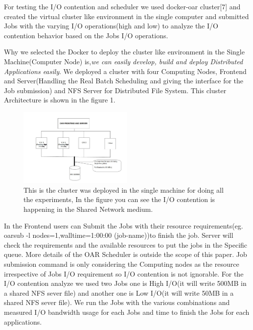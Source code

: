 \documentclass{article}
\begin{document}
For testing the I/O contention and scheduler we used docker-oar cluster[7] and  created the virtual cluster like environment in the single computer and submitted Jobs with the  varying I/O operations(high and low) to analyze the I/O contention behavior based on the Jobs I/O operations. %


Why we selected the Docker to deploy the cluster like environment in the Single Machine(Computer Node) is,{\em we can easily develop, build and deploy Distributed Applications easily}\cite{docker-oar}\cite{docker}. We deployed a cluster with four Computing Nodes, Frontend and Server(Handling the Real Batch Scheduling and giving the interface for the Job submission)\cite{inproceedingscapit.cd-cghmmnr_bswhlc_05} and NFS Server for Distributed File System. This cluster Architecture is shown in the figure 1.
\newline
\begin{figure}
  \centering    
      \includegraphics[width=0.5\textwidth]{CusterArchitecture-exp.jpg}
  \caption{This is the cluster was deployed in the single machine for doing all the experiments, In the figure you can see the I/O contention is happening in the Shared Network medium. }
\end{figure}
In the Frontend users can Submit the Jobs with their resource requirements(eg. oarsub -l nodes=1,walltime=1:00:00 (job-name))to finish the job. Server will check the requirements and the available resources to put the jobs in the Specific queue. More details of the OAR\cite{inproceedingscapit.cd-cghmmnr_bswhlc_05} Scheduler is outside the scope of this paper. Job submission command is only considering the {\typebf Computing nodes} as the resource irrespective of Jobs I/O requirement so I/O contention is not ignorable. For the I/O contention analyze we used two Jobs one is High I/O(it will write 500MB in a shared NFS sever file) and another one is Low I/O(it will write 50MB in a shared NFS sever file). We run the Jobs with the various combinations and measured I/O bandwidth usage for each Jobs and time to finish the Jobs for each applications.
\end{document}
